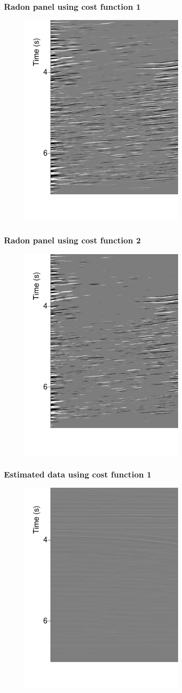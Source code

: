 \begin{frame} \frametitle{Radon panel using cost function 1}
\begin{figure}[t]
\centering
\includegraphics[width=0.75\textwidth,height=0.5\textwidth,keepaspectratio=false]{syn5d/Fig/high_resolution_radon_without_statics.pdf}
\end{figure}
\end{frame}

\begin{frame} \frametitle{Radon panel using cost function 2}
\begin{figure}[t]
\centering
\includegraphics[width=0.75\textwidth,height=0.5\textwidth,keepaspectratio=false]{syn5d/Fig/high_resolution_radon_with_statics.pdf}
\end{figure}
\end{frame}

\begin{frame} \frametitle{Estimated data using cost function 1}
\begin{figure}[t]
\centering
\includegraphics[width=0.75\textwidth,height=0.5\textwidth,keepaspectratio=false]{syn5d/Fig/estimated_data_without_statics.pdf}
\end{figure}
\end{frame}

